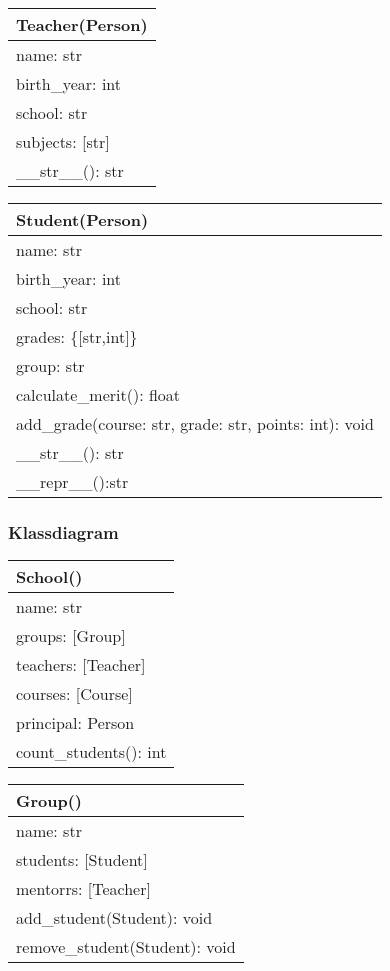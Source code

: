 \documentclass[aspectratio=169]{beamer}
\begin{document}
\begin{frame}

	\begin{multicols}{2}
		
		\begin{tabular}{|l|}
			\hline
			Teacher(Person) \\ \hline
			name: str\\
			birth\_year: int\\
			school: str\\
			subjects: [str]\\ \hline
			\_\_str\_\_(): str \\ \hline
		\end{tabular}
		
		\begin{tabular}{|l|}
			\hline
			Student(Person) \\ \hline
			name: str\\
			birth\_year: int\\
			school: str\\
			grades: \{[str,int]\}\\
			group: str \\ \hline
			calculate\_merit(): float\\
			add\_grade(course: str, grade: str, points: int):  void\\
			\_\_str\_\_(): str\\
			\_\_repr\_\_():str\\ \hline
		\end{tabular}
			
	\end{multicols}
	
\end{frame}

\begin{frame}
	\frametitle{Klassdiagram}
	
	\begin{multicols}{2}
		\begin{tabular}{|l|}
			\hline
			School()\\ \hline
			name: str\\
			groups: [Group]\\
			teachers: [Teacher]\\
			courses: [Course]\\
			principal: Person\\ \hline
			count\_students(): int\\
			\hline
		\end{tabular}
		
		\begin{tabular}{|l|}
			\hline
			Group()\\ \hline
			name: str\\
			students: [Student]\\
			mentorrs: [Teacher]\\ \hline
			add\_student(Student): void\\
			remove\_student(Student): void\\ \hline
		\end{tabular}
	\end{multicols}
	
\end{frame}
\end{document}
